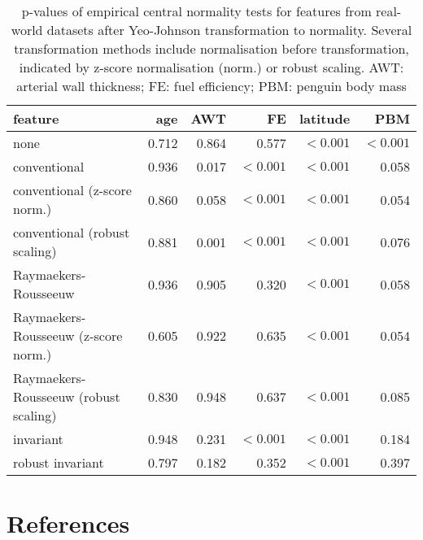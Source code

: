 \documentclass[
  a4paper,
]{article}
\begin{document}
\begin{table}
\begin{center}
\caption{
p-values of empirical central normality tests for features from real-world datasets after Yeo-Johnson transformation to normality.
Several transformation methods include normalisation before transformation, indicated by z-score normalisation (norm.) or robust scaling. 
AWT: arterial wall thickness; FE: fuel efficiency; PBM: penguin body mass}
\label{tab:normalisation-before-transformation-p-value-appendix}
\begin{tabular}{l | r r r r r}

\toprule
feature & age & AWT & FE & latitude & PBM \\

\midrule
none                                  & 0.712 & 0.864 & 0.577     & $< 0.001$ & $< 0.001$ \\
conventional                          & 0.936 & 0.017 & $< 0.001$ & $< 0.001$ & 0.058 \\
conventional (z-score norm.)          & 0.860 & 0.058 & $< 0.001$ & $< 0.001$ & 0.054 \\
conventional (robust scaling)         & 0.881 & 0.001 & $< 0.001$ & $< 0.001$ & 0.076 \\
Raymaekers-Rousseeuw                  & 0.936 & 0.905 & 0.320     & $< 0.001$ & 0.058 \\
Raymaekers-Rousseeuw (z-score norm.)  & 0.605 & 0.922 & 0.635     & $< 0.001$ & 0.054 \\
Raymaekers-Rousseeuw (robust scaling) & 0.830 & 0.948 & 0.637     & $< 0.001$ & 0.085 \\
invariant                             & 0.948 & 0.231 & $< 0.001$ & $< 0.001$ & 0.184 \\
robust invariant                      & 0.797 & 0.182 & 0.352     & $< 0.001$ & 0.397 \\
\bottomrule
\end{tabular}
\end{center}
\end{table}

\section*{References}\label{references}
\end{document}
